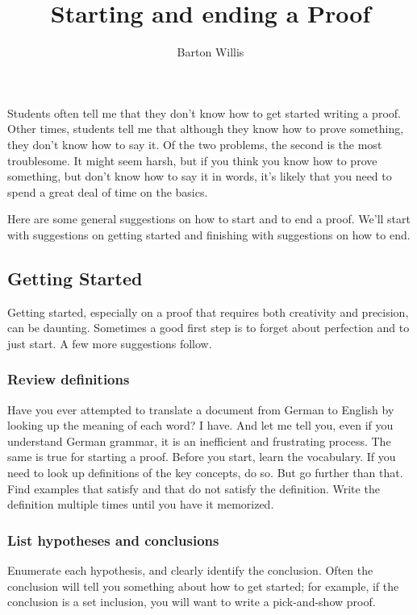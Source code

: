 \documentclass[12pt,fleqn]{article}
\title{Starting and ending a Proof}
\author{Barton Willis}
\newcounter{ex}\setcounter{ex}{0}
\newcounter{id}\setcounter{id}{0}
\newcounter{se}\setcounter{se}{0}
\begin{document}
\maketitle

Students often tell me that they don't know how to get started writing a proof. Other times, students tell me that although they know how to prove something, they don't know how to say it. Of the two problems, the second is the most troublesome. It
might seem harsh, but if you think you know how to prove something, but don't know how to say it in words, it's likely that 
you need to spend a great deal of time on the basics.

Here are some general suggestions on how to start and to end a proof. We'll start with suggestions on 
getting started and finishing with suggestions on how to end.

\subsection{Getting Started}

Getting started, especially on a proof that requires both
creativity and precision, can be daunting.  Sometimes a good first step is to forget about 
perfection and to just start. A few more suggestions follow.

\subsubsection{Review definitions} 

Have you ever attempted to translate a 
document from German to English by looking up the meaning of each 
word? I have. And let me tell you, even if you understand German grammar, 
 it is an inefficient and frustrating process. The same is true
 for starting a proof. Before you start, learn the vocabulary. If you 
 need to look up definitions of the key concepts, do so. But go further than that. 
 Find examples that satisfy and that do not satisfy the definition. Write the
 definition multiple times until you have it memorized.

 \subsubsection{List hypotheses and conclusions} 

 Enumerate each hypothesis, and clearly
 identify the conclusion.  Often the conclusion will tell you something about how
 to get started; for example, if the conclusion is a set inclusion, you will want
 to write a pick-and-show proof.
\end{document}

